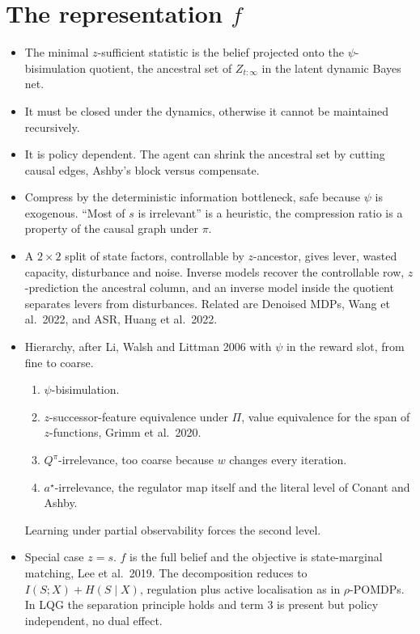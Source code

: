 \documentclass[10pt]{article}
\begin{document}
\section{The representation $f$}
\begin{itemize}
  \item The minimal $z$-sufficient statistic is the belief projected onto the $\psi$-bisimulation quotient, the ancestral set of $Z_{t:\infty}$ in the latent dynamic Bayes net.
  \item It must be closed under the dynamics, otherwise it cannot be maintained recursively.
  \item It is policy dependent.
    The agent can shrink the ancestral set by cutting causal edges, Ashby's block versus compensate.
  \item Compress by the deterministic information bottleneck, safe because $\psi$ is exogenous.
    ``Most of $s$ is irrelevant'' is a heuristic, the compression ratio is a property of the causal graph under $\pi$.
  \item A $2 \times 2$ split of state factors, controllable by $z$-ancestor, gives lever, wasted capacity, disturbance and noise.
    Inverse models recover the controllable row, $z$-prediction the ancestral column, and an inverse model inside the quotient separates levers from disturbances.
    Related are Denoised MDPs, Wang et al.\ 2022, and ASR, Huang et al.\ 2022.
  \item Hierarchy, after Li, Walsh and Littman 2006 with $\psi$ in the reward slot, from fine to coarse.
  \begin{enumerate}
    \item $\psi$-bisimulation.
    \item $z$-successor-feature equivalence under $\Pi$, value equivalence for the span of $z$-functions, Grimm et al.\ 2020.
    \item $Q^\pi$-irrelevance, too coarse because $w$ changes every iteration.
    \item $a^\star$-irrelevance, the regulator map itself and the literal level of Conant and Ashby.
  \end{enumerate}
    Learning under partial observability forces the second level.
  \item Special case $z = s$.
    $f$ is the full belief and the objective is state-marginal matching, Lee et al.\ 2019.
    The decomposition reduces to $I(S;X) + H(S \mid X)$, regulation plus active localisation as in $\rho$-POMDPs.
    In LQG the separation principle holds and term 3 is present but policy independent, no dual effect.
\end{itemize}
\end{document}
